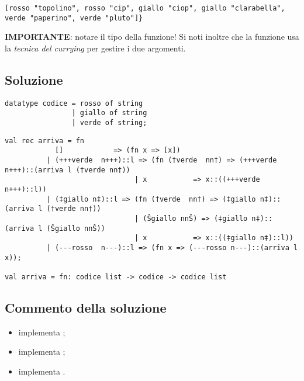 \begin{lstlisting}
[rosso "topolino", rosso "cip", giallo "ciop", giallo "clarabella", verde "paperino", verde "pluto"]}
\end{lstlisting}

\medskip
\textbf{IMPORTANTE}: notare il tipo della funzione! Si noti inoltre che la funzione usa la \emph{tecnica del currying} per gestire i due argomenti.

\subsection{Soluzione}

\begin{lstlisting}[style = SML, nolol = true, caption = {Definizione del tipo di dato \sml{codice}}]
datatype codice = rosso of string
				| giallo of string
				| verde of string;
\end{lstlisting}

\begin{lstlisting}[style = SML, caption = {Definizione della funzione \sml{arriva}}]
val rec arriva = fn
		    []			  => (fn x => [x])
		  | (+++verde  n+++)::l => (fn (†verde  nn†) => (+++verde n+++)::(arriva l (†verde nn†))
							   | x           => x::((+++verde n+++)::l))
		  | (‡giallo n‡)::l => (fn (†verde  nn†) => (‡giallo n‡)::(arriva l (†verde nn†))
		  					   | (Šgiallo nnŠ) => (‡giallo n‡)::(arriva l (Šgiallo nnŠ))
							   | x           => x::((‡giallo n‡)::l))
		  | (---rosso  n---)::l => (fn x => (---rosso n---)::(arriva l x));

val arriva = fn: codice list -> codice -> codice list
\end{lstlisting}

\subsection{Commento della soluzione}

\begin{itemize}
	\item {} implementa ;
	\item {} implementa ;
	\item {} implementa .
\end{itemize}
